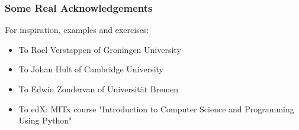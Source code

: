 \begin{frame}
 \frametitle{Some Real Acknowledgements}
 For inspiration, examples and exercises:
 \begin{itemize}
  \item To Roel Verstappen of Groningen University
  \item To Johan Hult of Cambridge University
  \item To Edwin Zondervan of Universit\"at Bremen
  \item To edX: MITx course  "Introduction to Computer Science and Programming Using Python"
 \end{itemize}
\end{frame}
% 



